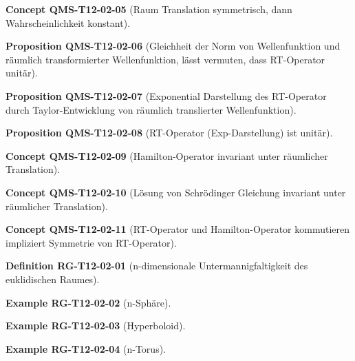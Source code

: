 \documentclass[10pt, letterpaper]{article}
\newcommand{\CustomHeading}[3]{%
  \par\medskip\noindent%
  \textbf{#1 #2} \textnormal{(#3)}.\enskip%
}
\newenvironment{DEF}[2]{\CustomHeading{Definition}{#1}{#2}}{}
\newenvironment{PROP}[2]{\CustomHeading{Proposition}{#1}{#2}}{}
\newenvironment{EXA}[2]{\CustomHeading{Example}{#1}{#2}}{}
\newenvironment{CONC}[2]{\CustomHeading{Concept}{#1}{#2}}{}
\begin{document}
\begin{CONC}{QMS-T12-02-05}{Raum Translation symmetrisch, dann Wahrscheinlichkeit konstant}
\end{CONC}

\begin{PROP}{QMS-T12-02-06}{Gleichheit der Norm von Wellenfunktion und räumlich transformierter Wellenfunktion, lässt vermuten, dass RT-Operator unitär}
\end{PROP}

\begin{PROP}{QMS-T12-02-07}{Exponential Darstellung des RT-Operator durch Taylor-Entwicklung von räumlich translierter Wellenfunktion}
\end{PROP}

\begin{PROP}{QMS-T12-02-08}{RT-Operator (Exp-Darstellung) ist unitär}
\end{PROP}

\begin{CONC}{QMS-T12-02-09}{Hamilton-Operator invariant unter räumlicher Translation}
\end{CONC}

\begin{CONC}{QMS-T12-02-10}{Lösung von Schrödinger Gleichung invariant unter räumlicher Translation}
\end{CONC}

\begin{CONC}{QMS-T12-02-11}{RT-Operator und Hamilton-Operator kommutieren impliziert Symmetrie von RT-Operator}
\end{CONC}

\begin{DEF}{RG-T12-02-01}{n-dimensionale Untermannigfaltigkeit des euklidischen Raumes}
\end{DEF}

\begin{EXA}{RG-T12-02-02}{n-Sphäre}
\end{EXA}

\begin{EXA}{RG-T12-02-03}{Hyperboloid}
\end{EXA}

\begin{EXA}{RG-T12-02-04}{n-Torus}
\end{EXA}
\end{document}
